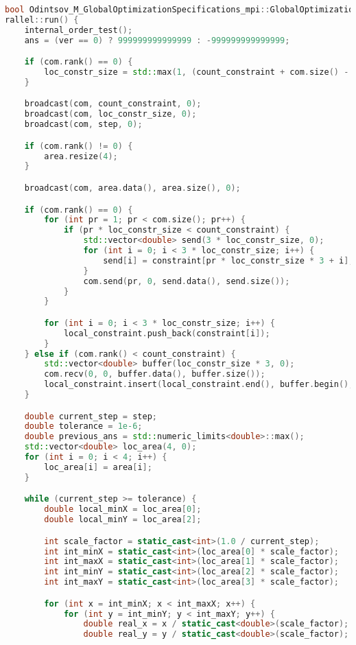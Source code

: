 \documentclass[a4paper,12pt]{article}
\begin{document}
\begin{lstlisting}[language=C++, caption=Код параллельной версии]
bool Odintsov_M_GlobalOptimizationSpecifications_mpi::GlobalOptimizationSpecificationsMPIPa
rallel::run() {
    internal_order_test();
    ans = (ver == 0) ? 999999999999999 : -999999999999999;

    if (com.rank() == 0) {
        loc_constr_size = std::max(1, (count_constraint + com.size() - 1) / com.size());
    }

    broadcast(com, count_constraint, 0);
    broadcast(com, loc_constr_size, 0);
    broadcast(com, step, 0);

    if (com.rank() != 0) {
        area.resize(4);
    }

    broadcast(com, area.data(), area.size(), 0);

    if (com.rank() == 0) {
        for (int pr = 1; pr < com.size(); pr++) {
            if (pr * loc_constr_size < count_constraint) {
                std::vector<double> send(3 * loc_constr_size, 0);
                for (int i = 0; i < 3 * loc_constr_size; i++) {
                    send[i] = constraint[pr * loc_constr_size * 3 + i];
                }
                com.send(pr, 0, send.data(), send.size());
            }
        }

        for (int i = 0; i < 3 * loc_constr_size; i++) {
            local_constraint.push_back(constraint[i]);
        }
    } else if (com.rank() < count_constraint) {
        std::vector<double> buffer(loc_constr_size * 3, 0);
        com.recv(0, 0, buffer.data(), buffer.size());
        local_constraint.insert(local_constraint.end(), buffer.begin(), buffer.end());
    }

    double current_step = step;
    double tolerance = 1e-6;
    double previous_ans = std::numeric_limits<double>::max();
    std::vector<double> loc_area(4, 0);
    for (int i = 0; i < 4; i++) {
        loc_area[i] = area[i];
    }

    while (current_step >= tolerance) {
        double local_minX = loc_area[0];
        double local_minY = loc_area[2];

        int scale_factor = static_cast<int>(1.0 / current_step);
        int int_minX = static_cast<int>(loc_area[0] * scale_factor);
        int int_maxX = static_cast<int>(loc_area[1] * scale_factor);
        int int_minY = static_cast<int>(loc_area[2] * scale_factor);
        int int_maxY = static_cast<int>(loc_area[3] * scale_factor);

        for (int x = int_minX; x < int_maxX; x++) {
            for (int y = int_minY; y < int_maxY; y++) {
                double real_x = x / static_cast<double>(scale_factor);
                double real_y = y / static_cast<double>(scale_factor);


\end{lstlisting}
\end{document}
